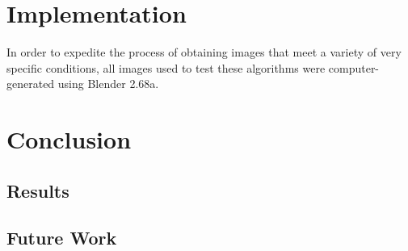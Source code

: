 \documentclass{article}
\begin{document}

\section{Implementation}
In order to expedite the process of obtaining images that meet a variety of very specific conditions, all images used to test these algorithms were computer-generated using Blender 2.68a.


\section{Conclusion}
\subsection{Results}
\subsection{Future Work}

\clearpage

\appendix
%


\end{document}
